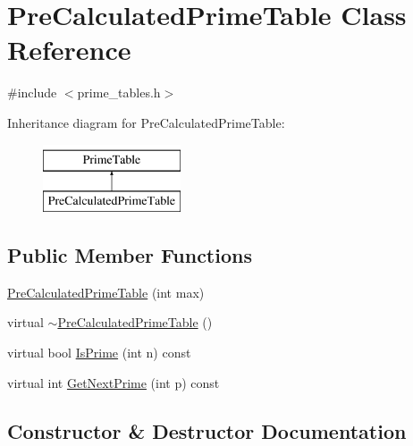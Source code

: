 \hypertarget{classPreCalculatedPrimeTable}{}\section{Pre\+Calculated\+Prime\+Table Class Reference}
\label{classPreCalculatedPrimeTable}


{\ttfamily \#include $<$prime\+\_\+tables.\+h$>$}

Inheritance diagram for Pre\+Calculated\+Prime\+Table\+:\begin{figure}[H]
\begin{center}
\leavevmode
\includegraphics[height=2.000000cm]{classPreCalculatedPrimeTable}
\end{center}
\end{figure}
\subsection*{Public Member Functions}
\begin{DoxyCompactItemize}
\item 
\mbox{\hyperlink{classPreCalculatedPrimeTable_a6bb947504421e31da70d2c71576be350}{Pre\+Calculated\+Prime\+Table}} (int max)
\item 
virtual \mbox{\hyperlink{classPreCalculatedPrimeTable_a6ceab295f80dbe2766b8d4f54138bbc4}{$\sim$\+Pre\+Calculated\+Prime\+Table}} ()
\item 
virtual bool \mbox{\hyperlink{classPreCalculatedPrimeTable_a8a9ab7f99b09e5e987933c260e7304cf}{Is\+Prime}} (int n) const
\item 
virtual int \mbox{\hyperlink{classPreCalculatedPrimeTable_a0ff10b1fe13df7e56b8d7ed9f41d3998}{Get\+Next\+Prime}} (int p) const
\end{DoxyCompactItemize}


\subsection{Constructor \& Destructor Documentation}
\mbox{\label{classPreCalculatedPrimeTable_a6bb947504421e31da70d2c71576be350}} 
